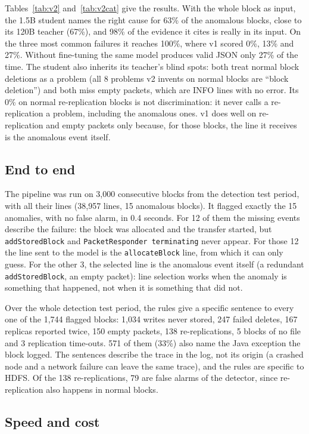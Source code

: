 \documentclass[11pt,a4paper]{article}
\newcommand{\code}[1]{\texttt{#1}}
\begin{document}
Tables~\ref{tab:v2} and~\ref{tab:v2cat} give the results. With the whole block as input, the
1.5B student names the right cause for 63\% of the anomalous blocks, close to its 120B teacher
(67\%), and 98\% of the evidence it cites is really in its input. On the three most common
failures it reaches 100\%, where v1 scored 0\%, 13\% and 27\%. Without fine-tuning the same model
produces valid JSON only 27\% of the time. The student also inherits its teacher's blind spots:
both treat normal block deletions as a problem (all 8 problems v2 invents on normal blocks are
``block deletion'') and both miss empty packets, which are INFO lines with no error. Its 0\% on
normal re-replication blocks is not discrimination: it never calls a re-replication a problem,
including the anomalous ones. v1 does well on re-replication and empty packets only because,
for those blocks, the line it receives is the anomalous event itself.

\subsection{End to end}
The pipeline was run on 3,000 consecutive blocks from the detection test period, with all
their lines (38,957 lines, 15 anomalous blocks). It flagged exactly the 15 anomalies, with no
false alarm, in 0.4 seconds. For 12 of them the missing events describe the failure: the block
was allocated and the transfer started, but \code{addStoredBlock} and \code{PacketResponder
terminating} never appear. For those 12 the line sent to the model is the \code{allocateBlock}
line, from which it can only guess. For the other 3, the selected line is the anomalous event
itself (a redundant \code{addStoredBlock}, an empty packet): line selection works when the
anomaly is something that happened, not when it is something that did not.

Over the whole detection test period, the rules give a specific sentence to every one of the
1,744 flagged blocks: 1,034 writes never stored, 247 failed deletes, 167 replicas reported
twice, 150 empty packets, 138 re-replications, 5 blocks of no file and 3 replication time-outs.
571 of them (33\%) also name the Java exception the block logged. The sentences describe the
trace in the log, not its origin (a crashed node and a network failure can leave the same
trace), and the rules are specific to HDFS. Of the 138 re-replications, 79 are false alarms of
the detector, since re-replication also happens in normal blocks.

\subsection{Speed and cost}
\end{document}
